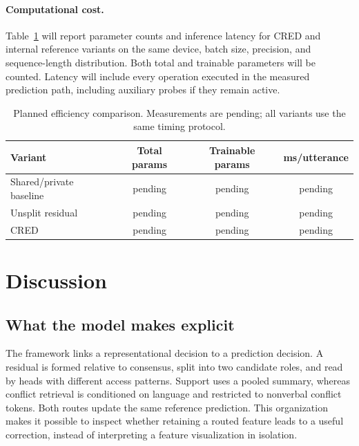 \documentclass[review,12pt]{elsarticle}
\begin{document}
\begin{table}[t]
\centering
\caption{Planned qualitative examples. Case contents and values are pending; row names describe selection categories, not observed findings.}
\label{tab:cases}
\end{table}

\paragraph{Computational cost.}
Table~\ref{tab:efficiency} will report parameter counts and inference latency for CRED and internal reference variants on the same device, batch size, precision, and sequence-length distribution. Both total and trainable parameters will be counted. Latency will include every operation executed in the measured prediction path, including auxiliary probes if they remain active.

\begin{table}[t]
\centering
\caption{Planned efficiency comparison. Measurements are pending; all variants use the same timing protocol.}
\label{tab:efficiency}
\begin{tabular}{lccc}
\toprule
Variant & Total params & Trainable params & ms/utterance\\
\midrule
Shared/private baseline & pending & pending & pending\\
Unsplit residual & pending & pending & pending\\
CRED & pending & pending & pending\\
\bottomrule
\end{tabular}
\end{table}

\section{Discussion}
\subsection{What the model makes explicit}
The framework links a representational decision to a prediction decision. A residual is formed relative to consensus, split into two candidate roles, and read by heads with different access patterns. Support uses a pooled summary, whereas conflict retrieval is conditioned on language and restricted to nonverbal conflict tokens. Both routes update the same reference prediction. This organization makes it possible to inspect whether retaining a routed feature leads to a useful correction, instead of interpreting a feature visualization in isolation.
\end{document}
